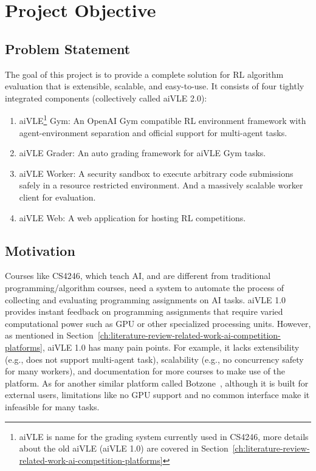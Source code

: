 \chapter{Project Objective}
\label{ch:project-objective}
\section{Problem Statement}
\label{s:project-objective-problem-statement}
The goal of this project is to provide a complete solution for RL algorithm evaluation that is extensible, scalable, and easy-to-use. It consists of four tightly integrated components (collectively called aiVLE 2.0):

\begin{enumerate}
    \item aiVLE\footnote{aiVLE is name for the grading system currently used in CS4246, more details about the old aiVLE (aiVLE 1.0) are covered in Section~\ref{ch:literature-review-related-work-ai-competition-platforms}} Gym: An OpenAI Gym \parencite{openai-gym} compatible RL environment framework with agent-environment separation and official support for multi-agent tasks.
    \item aiVLE Grader: An auto grading framework for aiVLE Gym tasks.
    \item aiVLE Worker: A security sandbox to execute arbitrary code submissions safely in a resource restricted environment. And a massively scalable worker client for evaluation.
    \item aiVLE Web: A web application for hosting RL competitions.
\end{enumerate}

\section{Motivation}
\label{s:project-objective-motivation}
Courses like CS4246, which teach AI, and are different from traditional programming/algorithm courses, need a system to automate the process of collecting and evaluating programming assignments on AI tasks. aiVLE 1.0 provides instant feedback on programming assignments that require varied computational power such as GPU or other specialized processing units. However, as mentioned in Section~\ref{ch:literature-review-related-work-ai-competition-platforms}, aiVLE 1.0 has many pain points. For example, it lacks extensibility (e.g., does not support multi-agent task), scalability (e.g., no concurrency safety for many workers), and documentation for more courses to make use of the platform. As for another similar platform called Botzone~\parencite{botzone}, although it is built for external users, limitations like no GPU support and no common interface make it infeasible for many tasks.

